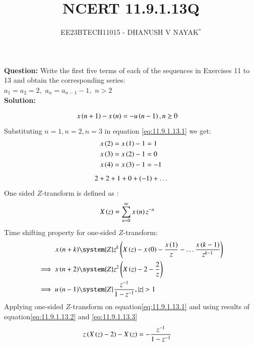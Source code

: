 \documentclass[journal,12pt,twocolumn]{IEEEtran}
\theoremstyle{remark}
\begin{document}

\title{NCERT 11.9.1.13Q}
\author{EE23BTECH11015 - DHANUSH V NAYAK$^{*}$%
}
\maketitle
\newpage
\bigskip
\renewcommand{\thefigure}{\arabic{figure}}
\renewcommand{\thetable}{\theenumi}
\textbf{Question:} Write the first five terms of each of the sequences in Exercises 11 to 13 and obtain the corresponding series:\\
$a_1=a_2=2,$\hspace{5pt} $a_n=a_{n-1} -1,$\hspace{5pt} $n>2$\\
\textbf{Solution:}

\begin{align}
    x\left(n+1\right) - x\left(n\right) &= -u\left(n-1\right) , n\geq 0 \label{eq:11.9.1.13.1}
\end{align}
Substituting $n=1 , n=2 ,n=3$ in equation \eqref{eq:11.9.1.13.1} we get:
\begin{align}
    x\left(2\right) &= x\left(1\right) - 1 = 1  \\
    x\left(3\right) &= x\left(2\right) - 1 = 0\\
    x\left(4\right) &= x\left(3\right) - 1 = -1 
\end{align}
\begin{align}
2 + 2 + 1 + 0 + (-1) + \dots \notag
\end{align}
One sided $Z$-transform is defined as :
\begin{align}
    X\left(z\right) &= \sum_{n=0}^\infty x\left(n\right) z^{-n}
\end{align}
Time shifting property for one-sided $Z$-transform:
\begin{align}
	x\brak{n+k}&\system{Z} z^{k}\brak{X\brak{z}-x\brak{0}-\frac{x\brak{1}}{z}-\ldots \frac{x\brak{k-1}}{z^{k-1}}}\label{eq:one-sided-shiftk}\\
\implies x\brak{n+2} &\system{Z} z^{2}\brak{X\brak{z}-2-\frac{2}{z}} 
\label{eq:11.9.1.13.2} \\
	\implies u\brak{n-1} &\system{Z} \frac{z^{-1}}{1-z^{-1}},\abs{z}>1 \label{eq:11.9.1.13.3}
\end{align}
Applying one-sided $Z$-transform on equation\eqref{eq:11.9.1.13.1} and using results of equation\eqref{eq:11.9.1.13.2} and \eqref{eq:11.9.1.13.3}
\begin{align}
    z\left(X\left(z\right)-2\right)- X\left(z\right) &= -\frac{z^{-1}}{1-z^{-1}}
\end{align}
\end{document}
